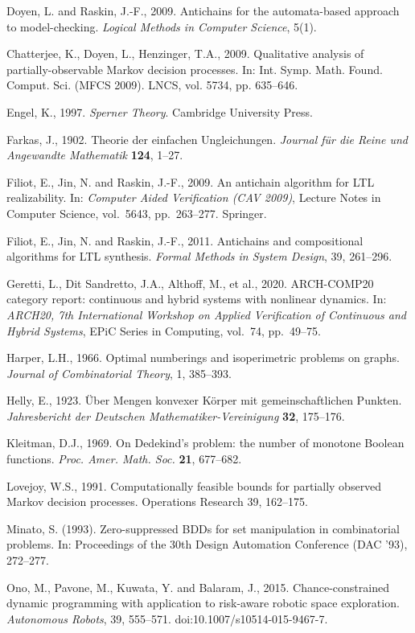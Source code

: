 \documentclass[10pt,twocolumn]{article}
\theoremstyle{plain}
\theoremstyle{definition}
\theoremstyle{remark}
\begin{document}
Doyen, L. and Raskin, J.-F., 2009. Antichains for the automata-based approach to
model-checking. \emph{Logical Methods in Computer Science}, 5(1).

Chatterjee, K., Doyen, L., Henzinger, T.A., 2009. Qualitative analysis of
partially-observable Markov decision processes. In: Int. Symp. Math. Found. Comput. Sci.
(MFCS 2009). LNCS, vol. 5734, pp. 635--646.

Engel, K., 1997. \emph{Sperner Theory}. Cambridge University Press.

Farkas, J., 1902. Theorie der einfachen Ungleichungen. \emph{Journal f\"ur die Reine und
Angewandte Mathematik} \textbf{124}, 1--27.

Filiot, E., Jin, N. and Raskin, J.-F., 2009. An antichain algorithm for LTL
realizability. In: \emph{Computer Aided Verification (CAV 2009)}, Lecture Notes in
Computer Science, vol.~5643, pp.~263--277. Springer.

Filiot, E., Jin, N. and Raskin, J.-F., 2011. Antichains and compositional algorithms
for LTL synthesis. \emph{Formal Methods in System Design}, 39, 261--296.

Geretti, L., Dit Sandretto, J.A., Althoff, M., et al., 2020. ARCH-COMP20 category report:
continuous and hybrid systems with nonlinear dynamics. In: \emph{ARCH20, 7th International
Workshop on Applied Verification of Continuous and Hybrid Systems}, EPiC Series in Computing,
vol.~74, pp.~49--75.

Harper, L.H., 1966. Optimal numberings and isoperimetric problems on graphs.
\emph{Journal of Combinatorial Theory}, 1, 385--393.

Helly, E., 1923. \"Uber Mengen konvexer K\"orper mit gemeinschaftlichen Punkten.
\emph{Jahresbericht der Deutschen Mathematiker-Vereinigung} \textbf{32}, 175--176.

Kleitman, D.J., 1969. On Dedekind's problem: the number of monotone Boolean functions.
\emph{Proc. Amer. Math. Soc.} \textbf{21}, 677--682.

Lovejoy, W.S., 1991. Computationally feasible bounds for partially
observed Markov decision processes. Operations Research 39, 162--175.

Minato, S. (1993). Zero-suppressed BDDs for set manipulation in combinatorial problems. In: Proceedings of the 30th Design Automation Conference (DAC '93), 272--277.

Ono, M., Pavone, M., Kuwata, Y. and Balaram, J., 2015. Chance-constrained dynamic
programming with application to risk-aware robotic space exploration. \emph{Autonomous
Robots}, 39, 555--571. doi:10.1007/s10514-015-9467-7.
\end{document}
